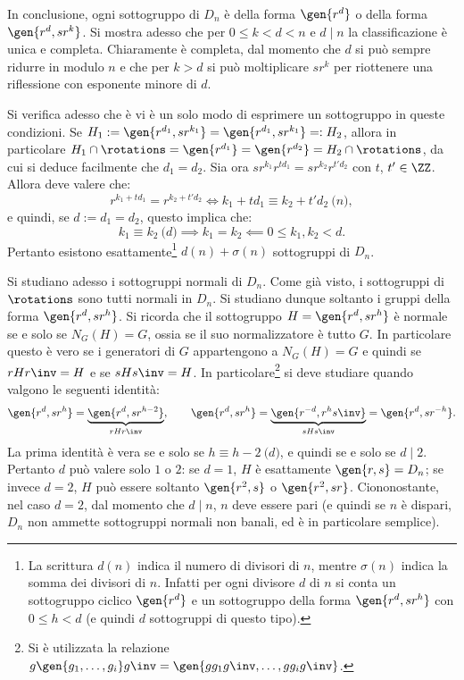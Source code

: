 \documentclass[12pt]{scrartcl}
\begin{document}
	
	In conclusione, ogni sottogruppo di $D_n$ è della forma $\gen{r^d}$ o della forma
	$\gen{r^d, sr^k}$. Si mostra adesso che per $0 \leq k < d < n$ e $d \mid n$ la
	classificazione è unica e completa. Chiaramente è completa, dal momento che
	$d$ si può sempre ridurre in modulo $n$ e che per $k>d$ si può moltiplicare
	$sr^k$ per riottenere una riflessione con esponente minore di $d$. \medskip
	
	
	Si verifica adesso che è vi è un solo modo di esprimere un sottogruppo in queste
	condizioni. Se $H_1 := \gen{r^{d_1}, s r^{k_1}} = \gen{r^{d_1}, s r^{k_1}} =: H_2$, allora
	in particolare $H_1 \cap \rotations = \gen{r^{d_1}} = \gen{r^{d_2}} = H_2 \cap \rotations$,
	da cui si deduce facilmente che $d_1 = d_2$. Sia ora $s r^{k_1} r^{t d_1} =
	s r^{k_2} r^{t' d_2}$ con $t$, $t' \in \ZZ$. Allora deve valere che:
	\[ r^{k_1 + t d_1} =r^{k_2 + t' d_2} \iff k_1 + t d_1 \equiv k_2 + t' d_2 \pod n, \]
	e quindi, se $d := d_1 = d_2$, questo implica che:
	\[ k_1 \equiv k_2 \pod d \implies k_1 = k_2 \impliedby 0 \leq k_1, k_2 < d. \]
	Pertanto esistono esattamente\footnote{
		La scrittura $d(n)$ indica il numero di divisori di $n$, mentre $\sigma(n)$ indica la 
		somma dei divisori di $n$. Infatti per ogni divisore $d$ di $n$ si conta un
		sottogruppo ciclico $\gen{r^d}$ e un sottogruppo della forma $\gen{r^d, sr^h}$
		con $0 \leq h < d$ (e quindi $d$ sottogruppi di questo tipo).
	} $d(n) + \sigma(n)$ sottogruppi di $D_n$. \bigskip
	
	
	
	Si studiano adesso i sottogruppi normali di $D_n$. Come già visto, i sottogruppi di
	$\rotations$ sono tutti normali in $D_n$. Si studiano dunque soltanto i gruppi
	della forma $\gen{r^d, s r^h}$. Si ricorda che il sottogruppo
	$H = \gen{r^d, s r^h}$ è normale se e solo se $N_G(H) = G$, ossia se il suo
	normalizzatore è tutto $G$. In particolare questo è vero se i generatori di $G$
	appartengono a $N_G(H) = G$ e quindi se $r H r\inv = H$ e se $s H s\inv = H$.
	In particolare\footnote{
		Si è utilizzata la relazione $g \gen{g_1, \ldots, g_i} g\inv = \gen{g g_1 g\inv, \ldots, g g_i g\inv}$.
	} si deve studiare quando valgono le seguenti identità:
	\[
		\gen{r^d, s r^h} = \underbrace{\gen{r^d, s r^{h-2}}}_{r H r\inv},
		\qquad \gen{r^d, s r^h} = \underbrace{\gen{r^{-d}, r^h s\inv}}_{s H s\inv} =
		\gen{r^d, s r^{-h}}.
	\]
	La prima identità è vera se e solo se $h \equiv h-2 \pod d$, e quindi se e solo
	se $d \mid 2$. Pertanto $d$ può valere solo $1$ o $2$: se $d = 1$, $H$ è
	esattamente $\gen{r, s} = D_n$; se invece $d = 2$, $H$ può essere soltanto
	$\gen{r^2, s}$ o $\gen{r^2, s r}$. Ciononostante, nel caso $d = 2$, dal momento
	che $d \mid n$, $n$ deve essere pari (e quindi se $n$ è dispari, $D_n$ non ammette
	sottogruppi normali non banali, ed è in particolare semplice). \medskip
	
\end{document}
